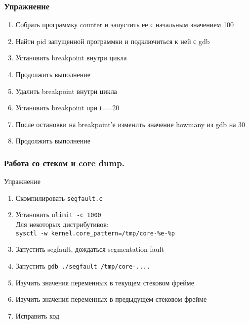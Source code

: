 \begin{frame}
  \frametitle{Упражнение}
  \begin{enumerate}
    \item Собрать программку counter и запустить ее с начальным значением 100
    \item Найти pid запущенной программки и подключиться к ней с gdb
    \item Установить breakpoint внутри цикла
    \item Продолжить выполнение
    \item Удалить breakpoint внутри цикла
    \item Установить breakpoint при i==20
    \item После остановки на breakpoint'е изменить значение howmany из gdb на 30
    \item Продолжить выполнение
  \end{enumerate}
\end{frame}

\begin{frame}
  \frametitle{Работа со стеком и core dump.}
  \begin{center}
    Упражнение
  \end{center}
  \begin{enumerate}
   \item Скомпилировать \texttt{segfault.c}
   \item Установить \texttt{ulimit -c 1000}\\
	   {\small Для некоторых дистрибутивов:\\ {\tt sysctl -w kernel.core\_pattern=/tmp/core-\%e-\%p}}
   \item Запустить segfault, дождаться segmentation fault
   \item Запустить \texttt{gdb ./segfault /tmp/core-....}
   \item Изучить значения переменных в текущем стековом фрейме
   \item Изучить значения переменных в предыдущем стековом фрейме
   \item Исправить код
  \end{enumerate}
\end{frame}

